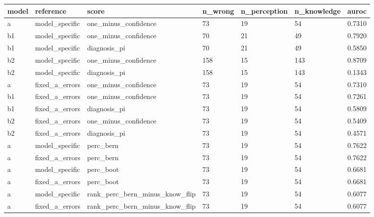 \begin{tabular}{lllllll}
\hline
model & reference & score & n\_wrong & n\_perception & n\_knowledge & auroc \\
\hline
a & model\_specific & one\_minus\_confidence & 73 & 19 & 54 & 0.7310 \\
b1 & model\_specific & one\_minus\_confidence & 70 & 21 & 49 & 0.7920 \\
b1 & model\_specific & diagnosis\_pi & 70 & 21 & 49 & 0.5850 \\
b2 & model\_specific & one\_minus\_confidence & 158 & 15 & 143 & 0.8709 \\
b2 & model\_specific & diagnosis\_pi & 158 & 15 & 143 & 0.1343 \\
a & fixed\_a\_errors & one\_minus\_confidence & 73 & 19 & 54 & 0.7310 \\
b1 & fixed\_a\_errors & one\_minus\_confidence & 73 & 19 & 54 & 0.7261 \\
b1 & fixed\_a\_errors & diagnosis\_pi & 73 & 19 & 54 & 0.5809 \\
b2 & fixed\_a\_errors & one\_minus\_confidence & 73 & 19 & 54 & 0.5409 \\
b2 & fixed\_a\_errors & diagnosis\_pi & 73 & 19 & 54 & 0.4571 \\
a & model\_specific & perc\_bern & 73 & 19 & 54 & 0.7622 \\
a & fixed\_a\_errors & perc\_bern & 73 & 19 & 54 & 0.7622 \\
a & model\_specific & perc\_boot & 73 & 19 & 54 & 0.6681 \\
a & fixed\_a\_errors & perc\_boot & 73 & 19 & 54 & 0.6681 \\
a & model\_specific & rank\_perc\_bern\_minus\_know\_flip & 73 & 19 & 54 & 0.6077 \\
a & fixed\_a\_errors & rank\_perc\_bern\_minus\_know\_flip & 73 & 19 & 54 & 0.6077 \\
\hline
\end{tabular}

